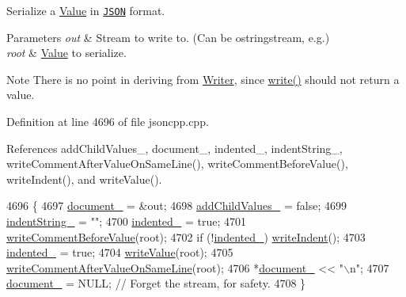 Serialize a \hyperlink{class_json_1_1_value}{Value} in \href{http://www.json.org}{\tt J\+S\+ON} format. 


\begin{DoxyParams}{Parameters}
{\em out} & Stream to write to. (Can be ostringstream, e.\+g.) \\
\hline
{\em root} & \hyperlink{class_json_1_1_value}{Value} to serialize. \\
\hline
\end{DoxyParams}
\begin{DoxyNote}{Note}
There is no point in deriving from \hyperlink{class_json_1_1_writer}{Writer}, since \hyperlink{class_json_1_1_styled_stream_writer_a5d89d984fe675641e42c4370cd247774}{write()} should not return a value. 
\end{DoxyNote}


Definition at line 4696 of file jsoncpp.\+cpp.



References add\+Child\+Values\+\_\+, document\+\_\+, indented\+\_\+, indent\+String\+\_\+, write\+Comment\+After\+Value\+On\+Same\+Line(), write\+Comment\+Before\+Value(), write\+Indent(), and write\+Value().


\begin{DoxyCode}
4696                                                                       \{
4697   \hyperlink{class_json_1_1_styled_stream_writer_aa8c4e4576f5c3dcb10955d133a092dd6}{document\_} = &out;
4698   \hyperlink{class_json_1_1_styled_stream_writer_a4e4bb7fc223b2652b72b523b1ce414fa}{addChildValues\_} = \textcolor{keyword}{false};
4699   \hyperlink{class_json_1_1_styled_stream_writer_a1481433ebe1491ea83b0beb92aed56c2}{indentString\_} = \textcolor{stringliteral}{""};
4700   \hyperlink{class_json_1_1_styled_stream_writer_aa12db1753619a9b48da41f3e45e3275d}{indented\_} = \textcolor{keyword}{true};
4701   \hyperlink{class_json_1_1_styled_stream_writer_a79c3c2b320475035c47b2db484a3e434}{writeCommentBeforeValue}(root);
4702   \textcolor{keywordflow}{if} (!\hyperlink{class_json_1_1_styled_stream_writer_aa12db1753619a9b48da41f3e45e3275d}{indented\_}) \hyperlink{class_json_1_1_styled_stream_writer_a5a52fa5b406f1580a61dde3b5638e76d}{writeIndent}();
4703   \hyperlink{class_json_1_1_styled_stream_writer_aa12db1753619a9b48da41f3e45e3275d}{indented\_} = \textcolor{keyword}{true};
4704   \hyperlink{class_json_1_1_styled_stream_writer_a4359250e09273fa0144021684be001ae}{writeValue}(root);
4705   \hyperlink{class_json_1_1_styled_stream_writer_ad2ca860e317ca91d6b2932535b4ce9c7}{writeCommentAfterValueOnSameLine}(root);
4706   *\hyperlink{class_json_1_1_styled_stream_writer_aa8c4e4576f5c3dcb10955d133a092dd6}{document\_} << \textcolor{stringliteral}{"\(\backslash\)n"};
4707   \hyperlink{class_json_1_1_styled_stream_writer_aa8c4e4576f5c3dcb10955d133a092dd6}{document\_} = NULL; \textcolor{comment}{// Forget the stream, for safety.}
4708 \}
\end{DoxyCode}
\mbox{\label{class_json_1_1_styled_stream_writer_a606f2ddd58093c9b019d452c1b6f09fe}} 
